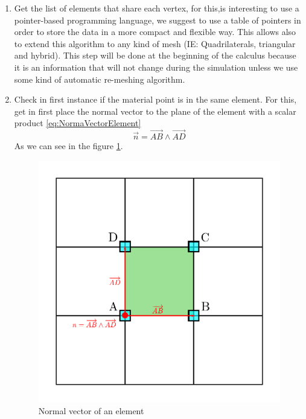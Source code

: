 \begin{enumerate}
\item Get the list of elements that share each vertex, for this,is
  interesting to use a pointer-based programming language, we suggest to
  use a table of pointers in order to store the data in a more compact
  and flexible way. This allows also to extend this algorithm to
  any kind of mesh (IE: Quadrilaterals, triangular and hybrid). This
  step will be done at the beginning of the calculus because it is an
  information that will not change during the simulation unless we
  use some kind of automatic re-meshing algorithm.  
\item Check in first instance if the material point is in the same
  element. For this, get in first place the normal vector to the plane
  of the element with a scalar product \eqref{eq:NormaVectorElement}
  \begin{equation}
    \label{eq:NormaVectorElement}
    \overrightarrow{n} = \overrightarrow{AB} \wedge \overrightarrow{AD}
  \end{equation}
  As we can see in the figure \ref{fig:NormalVector}.
  \begin{figure}
    \centering
    \includegraphics[scale=0.5]{./SECTIONS/TEX/ALGORITHMS/FIGURES/NormalVector}    
    \caption{Normal vector of an element}
    \label{fig:NormalVector}
  \end{figure}

\end{enumerate}

